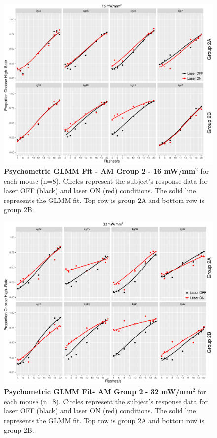 \begin{figure}
  \centering
   \includegraphics[width=\textwidth]{Figures/chapter4/glmm_PMFS_16mWmm2.png}
  \caption[Psychometric GLMM Fit - AM Group 2 - 16 mW/mm$^{2}$]{\textbf{Psychometric GLMM Fit - AM Group 2 - 16 mW/mm$^{2}$} for each mouse (n=8). Circles represent the subject's response data for laser OFF (black) and laser ON (red) conditions. The solid line represents the GLMM fit. Top row is group 2A and bottom row is group 2B. }
   \label{fig:amGLMM16}
\end{figure}
\begin{figure}
  \centering
   \includegraphics[width=\textwidth]{Figures/chapter4/glmm_PMFS_32mWmm2.png}
  \caption[Psychometric GLMM Fit - AM Group 2 - 32 mW/mm$^{2}$]{\textbf{Psychometric GLMM Fit- AM Group 2 - 32 mW/mm$^{2}$} for each mouse (n=8). Circles represent the subject's response data for laser OFF (black) and laser ON (red) conditions. The solid line represents the GLMM fit. Top row is group 2A and bottom row is group 2B.}
   \label{fig:amGLMM32}
\end{figure}
